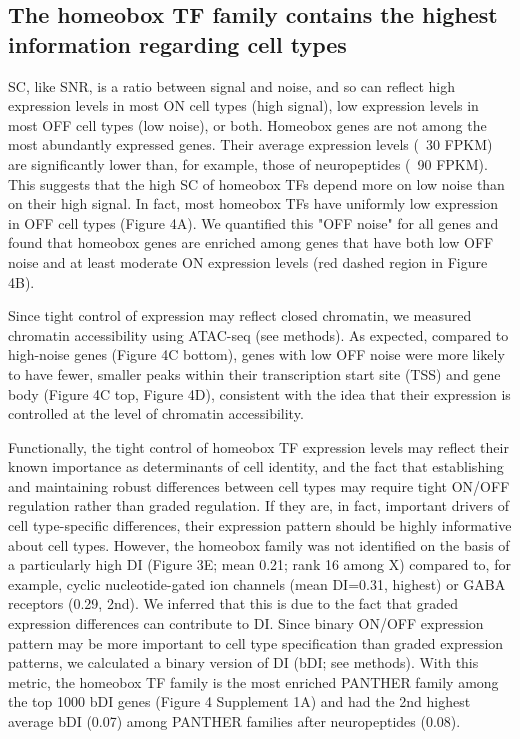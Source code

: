 \subsection{The homeobox TF family contains the highest information regarding cell types}

SC, like SNR, is a ratio between signal and noise, and so can reflect high expression levels in most ON cell types (high signal), low expression levels in most OFF cell types (low noise), or both. Homeobox genes are not among the most abundantly expressed genes. Their average expression levels (~30 FPKM) are significantly lower than, for example, those of neuropeptides (~90 FPKM). This suggests that the high SC of homeobox TFs depend more on low noise than on their high signal. In fact, most  homeobox TFs have uniformly low expression in OFF cell types (Figure 4A). We quantified this "OFF noise" for all genes and found that homeobox genes are enriched among genes that have both low OFF noise and at least moderate ON expression levels (red dashed region in Figure 4B).

Since tight control of expression may reflect closed chromatin, we measured chromatin accessibility using ATAC-seq (see methods). As expected, compared to high-noise genes (Figure 4C bottom), genes with low OFF noise were more likely to have fewer, smaller peaks within their transcription start site (TSS) and gene body (Figure 4C top, Figure 4D), consistent with the idea that their expression is controlled at the level of chromatin accessibility.

Functionally, the tight control of homeobox TF expression levels may reflect their known importance as determinants of cell identity, and the fact that establishing and maintaining robust differences between cell types may require tight ON/OFF regulation rather than graded regulation. If they are, in fact, important drivers of cell type-specific differences, their expression pattern should be highly informative about cell types. However, the homeobox family was not identified on the basis of a particularly high DI (Figure 3E; mean 0.21; rank 16 among X) compared to, for example, cyclic nucleotide-gated ion channels (mean DI=0.31, highest) or GABA receptors (0.29, 2nd). We inferred that this is due to the fact that graded expression differences can contribute to DI. Since binary ON/OFF expression pattern may be more important to cell type specification than graded expression patterns, we calculated a binary version of DI (bDI; see methods). With this metric, the homeobox TF family is the most enriched PANTHER family among the top 1000 bDI genes (Figure 4 Supplement 1A) and had the 2nd highest average bDI (0.07) among PANTHER families after neuropeptides (0.08).

